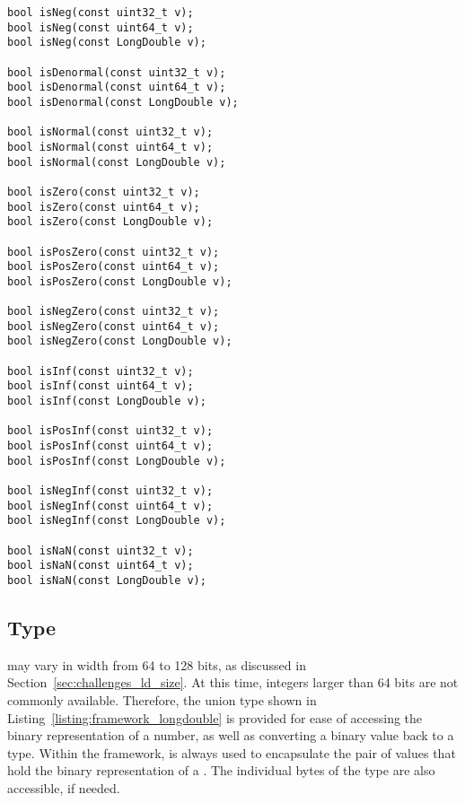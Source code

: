 \noindent
\begin{minipage}{\linewidth}
\begin{singlespace}
\begin{lstlisting}[caption=Floating-point type utility functions., label=listing:framework_type_funcs]
bool isNeg(const uint32_t v);
bool isNeg(const uint64_t v);
bool isNeg(const LongDouble v);

bool isDenormal(const uint32_t v);
bool isDenormal(const uint64_t v);
bool isDenormal(const LongDouble v);

bool isNormal(const uint32_t v);
bool isNormal(const uint64_t v);
bool isNormal(const LongDouble v);

bool isZero(const uint32_t v);
bool isZero(const uint64_t v);
bool isZero(const LongDouble v);

bool isPosZero(const uint32_t v);
bool isPosZero(const uint64_t v);
bool isPosZero(const LongDouble v);

bool isNegZero(const uint32_t v);
bool isNegZero(const uint64_t v);
bool isNegZero(const LongDouble v);

bool isInf(const uint32_t v);
bool isInf(const uint64_t v);
bool isInf(const LongDouble v);

bool isPosInf(const uint32_t v);
bool isPosInf(const uint64_t v);
bool isPosInf(const LongDouble v);

bool isNegInf(const uint32_t v);
bool isNegInf(const uint64_t v);
bool isNegInf(const LongDouble v);

bool isNaN(const uint32_t v);
bool isNaN(const uint64_t v);
bool isNaN(const LongDouble v);
\end{lstlisting}
\end{singlespace}
\end{minipage}

\subsection{ Type}
 may vary in width from 64 to 128 bits, as discussed in Section~\ref{sec:challenges_ld_size}. At this time, integers larger than 64 bits are not commonly available. Therefore, the  union type shown in Listing~\ref{listing:framework_longdouble} is provided for ease of accessing the binary representation of a  number, as well as converting a binary value back to a  type. Within the framework,  is always used to encapsulate the pair of  values that hold the binary representation of a . The individual bytes of the type are also accessible, if needed.


